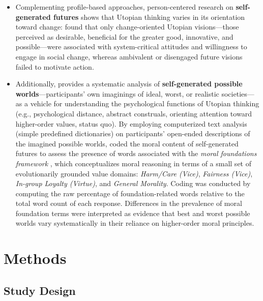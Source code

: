 \documentclass[jou,floatsintext]{apa7}
\begin{document}
\begin{itemize}
\begin{itemize}
    \end{itemize}
    \item Complementing profile-based approaches, person-centered research on \textbf{self-generated futures} shows that Utopian thinking varies in its orientation toward change: \textcite{lizzio-wilsonWhatCouldBe2025} found that only change-oriented Utopian visions---those perceived as desirable, beneficial for the greater good, innovative, and possible---were associated with system-critical attitudes and willingness to engage in social change, whereas ambivalent or disengaged future visions failed to motivate action.
    \item Additionally, \cite{panayiotouImpossibleWorldsSocial2020} provides a systematic analysis of \textbf{self-generated possible worlds}---participants’ own imaginings of ideal, worst, or realistic societies---as a vehicle for understanding the psychological functions of Utopian thinking (e.g., psychological distance, abstract construals, orienting attention toward higher-order values, status quo). By employing computerized text analysis (simple predefined dictionaries) on participants’ open-ended descriptions of the imagined possible worlds, \cite{panayiotouImpossibleWorldsSocial2020} coded the moral content of self-generated futures to assess the presence of words associated with the \textit{moral foundations framework} \parencite{atariMoralityWEIRDHow2023, haidtWhenMoralityOpposes2007, landowskaQuantitativeQualitativeAnalysis2024}, which conceptualizes moral reasoning in terms of a small set of evolutionarily grounded value domains: \emph{Harm/Care (Vice)}, \emph{Fairness (Vice)}, \emph{In-group Loyalty (Virtue)}, and \emph{General Morality}. Coding was conducted by computing the raw percentage of foundation-related words relative to the total word count of each response. Differences in the prevalence of moral foundation terms were interpreted as evidence that best and worst possible worlds vary systematically in their reliance on higher-order moral principles.
\end{itemize}


\section{Methods} \label{sec:methods}


\subsection{Study Design}
\end{document}
